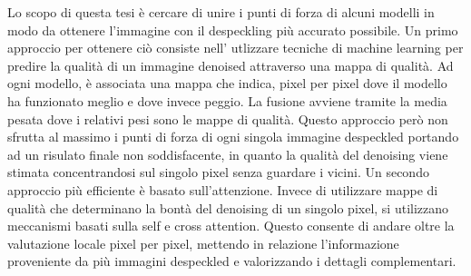 Lo scopo di questa tesi è cercare di unire i punti di forza di alcuni modelli in modo da ottenere l’immagine
con il despeckling più accurato possibile. Un primo approccio per ottenere ciò consiste nell' utlizzare tecniche di machine learning
per predire la qualità di un immagine denoised attraverso una mappa di qualità. Ad ogni modello,
è associata una mappa che indica, pixel per pixel dove il modello ha funzionato meglio e 
dove invece peggio. La fusione avviene tramite la media pesata dove i relativi pesi 
sono le mappe di qualità. Questo approccio però non sfrutta al massimo i punti di forza 
di ogni singola immagine despeckled portando ad un risulato finale non soddisfacente, 
in quanto la qualità del denoising viene stimata concentrandosi sul singolo pixel senza 
guardare i vicini. Un secondo approccio più efficiente è basato sull’attenzione. Invece 
di utilizzare mappe di qualità che determinano la bontà del denoising di un singolo 
pixel, si utilizzano meccanismi basati sulla self e cross attention. Questo consente di andare oltre 
la valutazione locale pixel per pixel, mettendo in relazione l’informazione proveniente 
da più immagini despeckled e valorizzando i dettagli complementari.
\medskip

